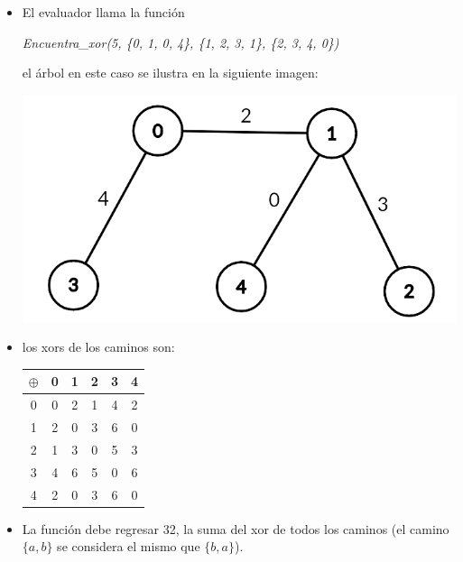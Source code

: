 \documentclass[12pt]{scrartcl}
\begin{document}
        \begin{itemize}
            \item  El evaluador llama la función 
            \begin{center}
                \textit{Encuentra\_xor(5, \{0, 1, 0, 4\}, \{1, 2, 3, 1\}, \{2, 3, 4, 0\})}
            \end{center}
            el árbol en este caso se ilustra en la siguiente imagen:
            
            \begin{center}
                \includegraphics[scale=0.3]{ej1.png}
            \end{center}
            
            \item los xors de los caminos son:

                \begin{center}
                    
                \begin{tabular}{|c||c|c|c|c|c|}
                     \hline
                      $\oplus$ & 0 & 1 & 2 & 3 & 4  \\
                     \hline
                     \hline 
                     0 & 0 & 2 & 1 & 4 & 2 \\
                     \hline 
                     1 & 2 & 0 & 3 & 6 & 0 \\ 
                     \hline
                     2 & 1 & 3 & 0 & 5 & 3 \\
                     \hline
                     3 & 4 & 6 & 5 & 0 & 6 \\
                     \hline
                     4 & 2 & 0 & 3 & 6 & 0 \\
                     \hline
                \end{tabular}
                
                \end{center}
            \item  La función debe regresar 32, la suma del xor de todos los caminos (el camino $\{a, b\}$ se considera el mismo que $\{b, a\}$).
                
        \end{itemize}
\end{document}
